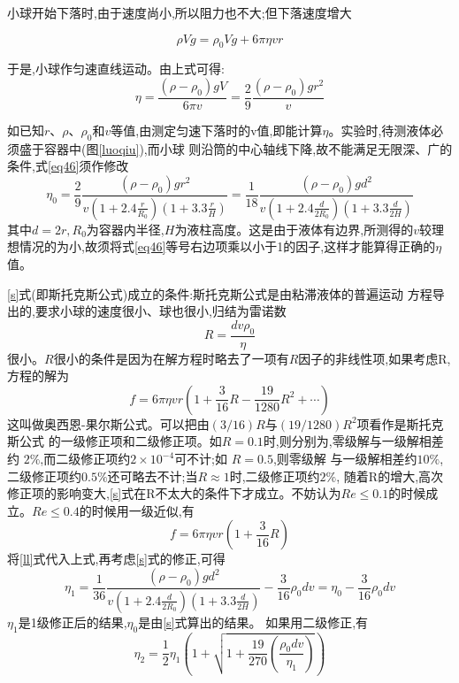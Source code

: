 \documentclass[12pt,a4paper]{ctexart}
\begin{document}
小球开始下落时,由于速度尚小,所以阻力也不大;但下落速度增大

\[\rho Vg=\rho_0 Vg+6\pi\eta vr\]

于是,小球作匀速直线运动。由上式可得:
\begin{equation}
\eta=\frac{(\rho-\rho_0)gV}{6\pi v}=\frac{2}{9}\frac{(\rho-\rho_0)gr^2}{v}
\label{eq46}
\end{equation}

如已知\(r、\rho、\rho_0\)和\(v\)等值,由测定匀速下落时的v值,即能计算\(\eta\)。实验时,待测液体必须盛于容器中(图\ref{luoqiu}),而小球
则沿筒的中心轴线下降,故不能满足无限深、广的条件,式\eqref{eq46}须作修改
\[\eta_0=\frac{2}{9}\frac{(\rho-\rho_0)gr^2}{v(1+2.4\frac{r}{R_0})(1+3.3\frac{r}{H})}=\frac{1}{18}\frac{(\rho-\rho_0)gd^2}{v(1+2.4\frac{d}{2R_0})(1+3.3\frac{d}{2H})}\]
其中$d=2r,R_0$为容器内半径,$H$为液柱高度。这是由于液体有边界,所测得的$v$较理想情况的为小,故须将式\eqref{eq46}等号右边项乘以小于1的因子,这样才能算得正确的\(\eta\)值。

\eqref{s}式(即斯托克斯公式)成立的条件:斯托克斯公式是由粘滞液体的普遍运动
方程导出的,要求小球的速度很小、球也很小,归结为雷诺数
\begin{equation}
R=\frac{dv\rho_0}{\eta}
\label{ll}
\end{equation}
很小。$R$很小的条件是因为在解方程时略去了一项有$R$因子的非线性项,如果考虑R,方程的解为
\[f = 6\pi\eta vr(1+\frac{3}{16}R-\frac{19}{1280}R^2+\cdots)\]
这叫做奥西恩-果尔斯公式。可以把由$(3/16)R$与\((19/1280)R^2\)项看作是斯托克斯公式
的一级修正项和二级修正项。如$R=0.1$时,则分别为,零级解与一级解相差约
\(2\%\),而二级修正项约\(2 \times 10^{-4}\)可不计;如 $R=0.5$,则零级解
与一级解相差约\(10\%\),二级修正项约\(0.5\%\)还可略去不计;当\(R≈1\)时,二级修正项约\(2\%\),
随着R的增大,高次修正项的影响变大,\eqref{s}式在R不太大的条件下才成立。不妨认为$Re\leq0.1$的时候成立。$Re\leq0.4$的时候用一级近似,有
\[f = 6\pi\eta vr(1+\frac{3}{16}R)\]
将\eqref{ll}式代入上式,再考虑\eqref{s}式的修正,可得
\[\eta_1=\frac{1}{36}\frac{(\rho-\rho_0)gd^2}{v(1+2.4\frac{d}{2R_0})(1+3.3\frac{d}{2H})}-\frac{3}{16}\rho_0dv=\eta_0-\frac{3}{16}\rho_0dv\]
$\eta_1$是1级修正后的结果,$\eta_0$是由\eqref{s}式算出的结果。 如果用二级修正,有
\[\eta_2=\frac{1}{2}\eta_1\left(1+\sqrt{1+\frac{19}{270}\left(\frac{\rho_0dv}{\eta_1}\right)}\right)\]
\end{document}
